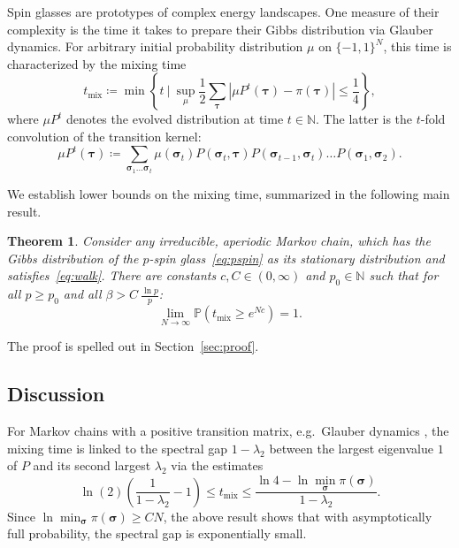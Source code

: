 \documentclass[letterpaper, DIV=17]{scrartcl}
\newtheorem{theorem}{Theorem}[section]  %
\numberwithin{equation}{section}
\theoremstyle{definition}
\newcommand{\btau}{\boldsymbol{\tau} }
\newcommand{\bsig}{\boldsymbol{\sigma} }
\begin{document}
Spin glasses are prototypes of complex energy landscapes. One measure of their complexity is the time it takes to prepare their Gibbs distribution via Glauber dynamics. For arbitrary initial probability distribution $ \mu $ on $ \{ -1,1\}^N $, this time is characterized by the mixing time
\begin{equation}
t_{\textrm{mix}} \coloneqq \min\left\{ t \ \Big| \ \sup_{\mu} \frac{1}{2} \sum_{\btau} \left| \mu P^t(\btau) - \pi(\btau) \right| \leq \frac{1}{4} \right\} , 
\end{equation}
where $ \mu P^t $ denotes the evolved distribution at time $ t \in \mathbb{N} $. The latter is the $ t $-fold convolution of the transition kernel:
$$
\mu P^t(\btau) \coloneqq \sum_{\bsig_1 \dots \bsig_t} \mu(\bsig_t) P(\bsig_t,\btau) P(\bsig_{t-1}, \bsig_t) \dots P(\bsig_1,\bsig_2) .
$$




We establish lower bounds on the mixing time, summarized in the following main result.
\begin{theorem}\label{thm:main}
Consider any irreducible, aperiodic Markov chain, which has the Gibbs distribution of the $ p $-spin glass~\eqref{eq:pspin} as its stationary distribution and satisfies~\eqref{eq:walk}. 
There are constants $ c, C \in (0,\infty) $ and $ p_0 \in \mathbb{N} $ such that  for all $ p \geq p_0 $ and all $ \displaystyle\beta > C \  \frac{\ln p}{p}$:
\begin{equation}
   \lim_{N \to \infty } \mathbb{P}\left(  t_{\textrm{mix}} \geq e^{N c} \right) = 1 . 
\end{equation}
\end{theorem}
The proof is spelled out in Section~\ref{sec:proof}.
%
\subsection{Discussion}
For Markov chains with a positive transition matrix, e.g.\ Glauber dynamics \cite{DGU14}, the mixing time is linked to the spectral gap $1- \lambda_2 $ between the largest eigenvalue $ 1 $ of $ P $ and its second largest $ \lambda_2 $ via the estimates~\cite[Theorems 12.4 \& 12.5]{LY17}
\begin{equation}\label{eq_spectral_gap_mixing_bound}
\ln (2)\left(\frac{1}{1- \lambda_2}-1\right) \leq t_{\textrm{mix}}  \leq \frac{\ln 4 - \ln \min_{\bsig} \pi(\bsig)}{1- \lambda_2} .
\end{equation}
Since $\ln \min_{\bsig} \pi(\bsig) \geq C N$, the above result shows that with asymptotically full probability, the spectral gap is exponentially small. \\
\end{document}
